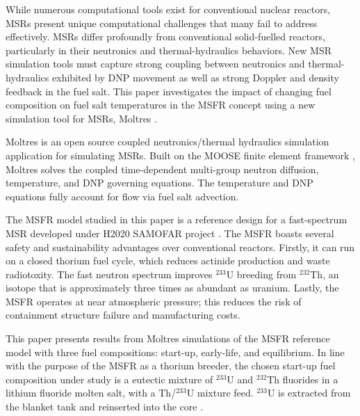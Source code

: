 \documentclass{anstrans}
\begin{document}
	While numerous computational tools exist for conventional nuclear reactors, 
    \glspl{MSR} present unique computational challenges that many fail to 
    address effectively. \glspl{MSR} differ
    profoundly from conventional 
    solid-fuelled reactors, particularly in their neutronics and 
    thermal-hydraulics behaviors.  New \gls{MSR} simulation tools must 
    capture strong coupling between neutronics and thermal-hydraulics 
    exhibited by \gls{DNP} movement as well as strong 
    Doppler and density feedback in the fuel salt.  This paper investigates 
    the impact of changing fuel composition on fuel salt temperatures in the 
    \gls{MSFR} concept using a new simulation tool for \glspl{MSR}, Moltres 
    \cite{lindsay_introduction_2018}.
    
    Moltres is an open source coupled neutronics/thermal hydraulics simulation 
    application for simulating \glspl{MSR}. Built on the \gls{MOOSE} finite 
    element framework \cite{gaston_moose:_2009}, Moltres solves the coupled 
    time-dependent multi-group neutron diffusion, temperature, and 
    \gls{DNP} governing equations.  The temperature and \gls{DNP} equations
    fully account for flow via fuel salt advection.
    
    The \gls{MSFR} model studied in this paper is a reference design for a 
    fast-spectrum \gls{MSR} developed under H2020
    \gls{SAMOFAR} project \cite{gerardin_design_nodate}.
    The \gls{MSFR} boasts several safety and sustainability advantages over
    conventional reactors. Firstly, it can run on a closed thorium fuel cycle,
    which reduces actinide production and waste radiotoxity.
    The fast neutron spectrum improves $^{233}$U breeding from $^{232}$Th, an
    isotope that is approximately three times as abundant as uranium.
    Lastly, the \gls{MSFR} operates at near atmospheric pressure; this reduces
    the risk of containment structure failure and manufacturing costs.
    
    This paper presents results from Moltres simulations of the 
    \gls{MSFR} reference model with three fuel compositions:
    start-up, early-life, and equilibrium. In line with the purpose of the
    \gls{MSFR} as a thorium breeder, the chosen start-up fuel composition
    under study is a eutectic mixture of $^{233}$U and 
    $^{232}$Th fluorides in a lithium fluoride molten salt, with
    a Th/$^{233}$U mixture feed. $^{233}$U is extracted from
    the blanket tank and reinserted into the core
    \cite{merle-lucotte_launching_2011}.
    
\end{document}

